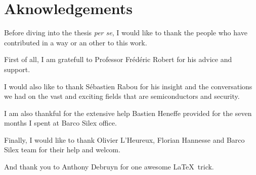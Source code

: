 \chapter*{Aknowledgements}






Before diving into the thesis \textit{per se}, I would like to thank the people who have contributed in a way or an other to this work.\newline{}

\noindent First of all, I am gratefull to Professor Frédéric Robert for his advice and support.\newline{}

\noindent I would also like to thank Sébastien Rabou for his insight and the conversations we had on the vast and exciting fields that are semiconductors and security.\newline{}

\noindent I am also thankful for the extensive help Bastien Heneffe provided for the seven months I spent at Barco Silex office.\newline{}

\noindent Finally, I would like to thank Olivier L'Heureux, Florian Hannesse and Barco Silex team for their help and welcom.\newline{}

\noindent And thank you to Anthony Debruyn for one awesome \LaTeX ~trick.